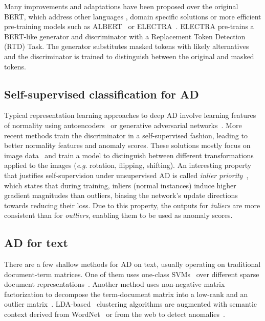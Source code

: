 \documentclass[11pt]{article}
\newcommand{\eg}{\textit{e}.\textit{g}. }
\begin{document}
Many improvements and adaptations have been proposed over the original BERT, which address other languages \cite{Martin2020,Vries2019}, domain specific solutions \cite{Beltagy2019,Lee2020} or more efficient pre-training models such as ALBERT~\cite{Lan2019} or ELECTRA~\cite{Clark2020}. 
ELECTRA pre-trains a BERT-like generator and discriminator with a Replacement Token Detection (RTD) Task. The generator substitutes masked tokens with likely alternatives and the discriminator is trained to distinguish between the original and masked tokens.

\subsection{Self-supervised classification for AD}
Typical representation learning approaches to deep AD involve learning features of normality using autoencoders~\cite{Hawkins2002, Sakurada2014,Chen2017} or generative adversarial networks~\cite{Schlegl2017}. More recent methods train the discriminator in a self-supervised fashion, leading to better normality features and anomaly scores. These solutions mostly focus on image data~\cite{Golan2018, neurips2019} and train a model to distinguish between different transformations applied to the images (\eg rotation, flipping, shifting). An interesting property that justifies self-supervision under unsupervised AD is called \emph{inlier priority}~\cite{neurips2019}, which states that during training, inliers (normal instances) induce higher gradient magnitudes than outliers, biasing the network's update directions towards reducing their loss. Due to this property, the outputs for \emph{inliers} are more consistent than for \emph{outliers}, enabling them to be used as anomaly scores.

\subsection{AD for text}
There are a few shallow methods for AD on text, usually operating on traditional document-term matrices. One of them uses one-class SVMs~\cite{Schlkopf2001} over different sparse document representations~\cite{Manevitz2001OneClassSF}. Another method uses non-negative matrix factorization to decompose the term-document matrix into a low-rank and an outlier matrix~\cite{Kannan2017}. LDA-based~\cite{Blei2003} clustering algorithms are augmented with semantic context derived from WordNet~\cite{Miller1995} or from the web to detect anomalies~\cite{Mahapatra2012}.
\end{document}
